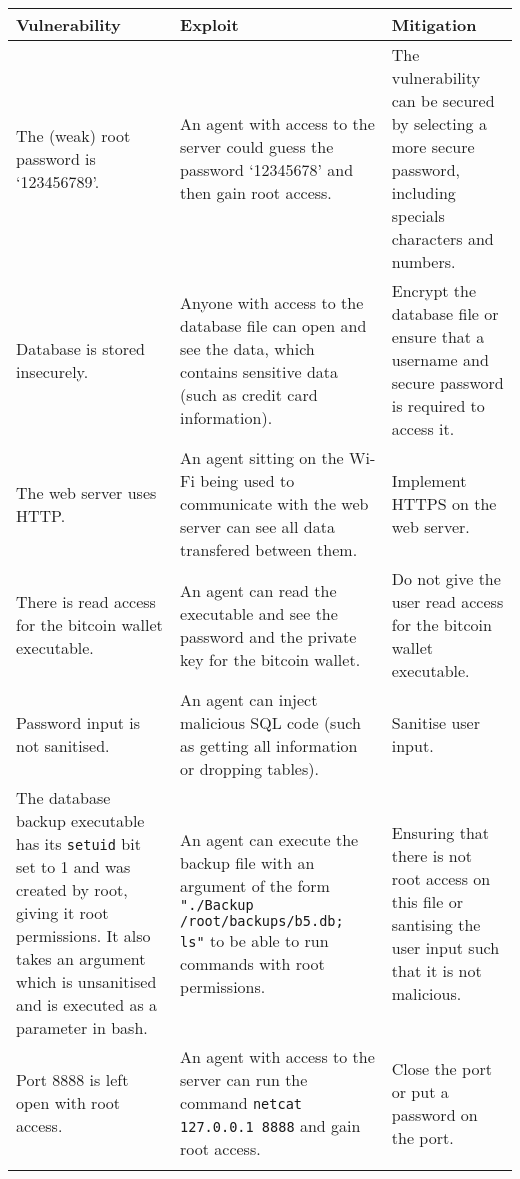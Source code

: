 \documentclass[a4paper]{article}
\begin{document}
\begin{longtable}{p{} p{} p{}}        
    \toprule
    Vulnerability & Exploit & Mitigation \\
    \midrule

    The (weak) root password is `123456789'. &
    An agent with access to the server could guess the password `12345678' and then gain root access. &
    The vulnerability can be secured by selecting a more secure password, including specials characters and numbers. \\
    \addlinespace

    Database is stored insecurely. & 
    Anyone with access to the database file can open and see the data, which contains sensitive data (such as credit card information). & 
    Encrypt the database file or ensure that a username and secure password is required to access it. \\
    \addlinespace

    The web server uses HTTP. &
    An agent sitting on the Wi-Fi being used to communicate with the web server can see all data transfered between them. &
    Implement HTTPS on the web server. \\
    \addlinespace

    There is read access for the bitcoin wallet executable. &
    An agent can read the executable and see the password and the private key for the bitcoin wallet. &
    Do not give the user read access for the bitcoin wallet executable. \\
    \addlinespace

    Password input is not sanitised. &
    An agent can inject malicious SQL code (such as getting all information or dropping tables). & 
    Sanitise user input. \\
    \addlinespace

    The database backup executable has its \texttt{setuid} bit set to 1 and was created by root, giving it root permissions. It also takes an argument which is unsanitised and is executed as a parameter in bash. & 
    An agent can execute the backup file with an argument of the form \texttt{"./Backup /root/backups/b5.db; ls"} to be able to run commands with root permissions. &
    Ensuring that there is not root access on this file or santising the user input such that it is not malicious. \\
    \addlinespace

    Port 8888 is left open with root access. &
    An agent with access to the server can run the command \texttt{netcat 127.0.0.1 8888} and gain root access. &
    Close the port or put a password on the port. \\
    \addlinespace


\end{longtable}
\end{document}

